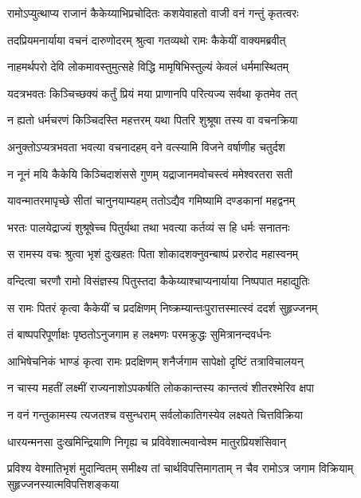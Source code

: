 \twolineshloka
{रामोऽप्युत्थाप्य राजानं कैकेय्याभिप्रचोदितः}
{कशयेवाहतो वाजी वनं गन्तुं कृतत्वरः} %

\twolineshloka
{तदप्रियमनार्याया वचनं दारुणोदरम्}
{श्रुत्वा गतव्यथो रामः कैकेयीं वाक्यमब्रवीत्} %

\twolineshloka
{नाहमर्थपरो देवि लोकमावस्तुमुत्सहे}
{विद्धि मामृषिभिस्तुल्यं केवलं धर्ममास्थितम्} %

\twolineshloka
{यदत्रभवतः किञ्चिच्छक्यं कर्तुं प्रियं मया}
{प्राणानपि परित्यज्य सर्वथा कृतमेव तत्} %

\twolineshloka
{न ह्यतो धर्मचरणं किञ्चिदस्ति महत्तरम्}
{यथा पितरि शुश्रूषा तस्य वा वचनक्रिया} %

\twolineshloka
{अनुक्तोऽप्यत्रभवता भवत्या वचनादहम्}
{वने वत्स्यामि विजने वर्षाणीह चतुर्दश} %

\twolineshloka
{न नूनं मयि कैकेयि किञ्चिदाशंससे गुणम्}
{यद्राजानमवोचस्त्वं ममेश्वरतरा सती} %

\twolineshloka
{यावन्मातरमापृच्छे सीतां चानुनयाम्यहम्}
{ततोऽद्यैव गमिष्यामि दण्डकानां महद्वनम्} %

\twolineshloka
{भरतः पालयेद्राज्यं शुश्रूषेच्च पितुर्यथा}
{तथा भवत्या कर्तव्यं स हि धर्मः सनातनः} %

\twolineshloka
{स रामस्य वचः श्रुत्वा भृशं दुःखहतः पिता}
{शोकादशक्नुवन्बाष्पं प्ररुरोद महास्वनम्} %

\twolineshloka
{वन्दित्वा चरणौ रामो विसंज्ञस्य पितुस्तदा}
{कैकेय्याश्चाप्यनार्याया निष्पपात महाद्युतिः} %

\twolineshloka
{स रामः पितरं कृत्वा कैकेयीं च प्रदक्षिणम्}
{निष्क्रम्यान्तःपुरात्तस्मात्स्वं ददर्श सुहृज्जनम्} %

\twolineshloka
{तं बाष्पपरिपूर्णाक्षः पृष्ठतोऽनुजगाम ह}
{लक्ष्मणः परमक्रुद्धः सुमित्रानन्दवर्धनः} %

\twolineshloka
{आभिषेचनिकं भाण्डं कृत्वा रामः प्रदक्षिणम्}
{शनैर्जगाम सापेक्षो दृष्टिं तत्राविचालयन्} %

\twolineshloka
{न चास्य महतीं लक्ष्मीं राज्यनाशोऽपकर्षति}
{लोककान्तस्य कान्तत्वं शीतरश्मेरिव क्षपा} %

\twolineshloka
{न वनं गन्तुकामस्य त्यजतश्च वसुन्धराम्}
{सर्वलोकातिगस्येव लक्ष्यते चित्तविक्रिया} %

\twolineshloka
{धारयन्मनसा दुःखमिन्द्रियाणि निगृह्य च}
{प्रविवेशात्मवान्वेश्म मातुरप्रियशंसिवान्} %

\fourlineindentedshloka
{प्रविश्य वेश्मातिभृशं मुदान्वितम्}
{समीक्ष्य तां चार्थविपत्तिमागताम्}
{न चैव रामोऽत्र जगाम विक्रियाम्}
{सुहृज्जनस्यात्मविपत्तिशङ्कया} %


